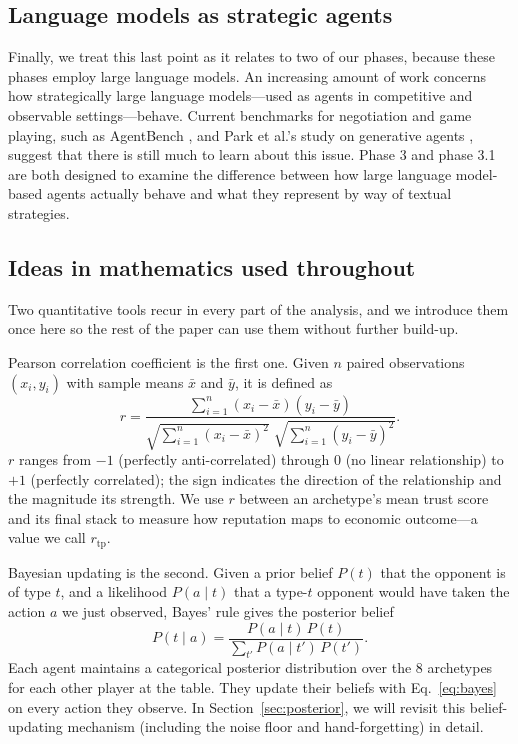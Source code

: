 \documentclass[10pt]{article} %
\newcommand{\rtp}{\ensuremath{r_{\mathrm{tp}}}}
\begin{document}
\subsection{Language models as strategic agents}
Finally, we treat this last point as it relates to two of our phases,
because these phases employ large language models. An increasing
amount of work concerns how strategically large language
models---used as agents in competitive and observable
settings---behave. Current benchmarks for negotiation and game
playing, such as AgentBench \citep{liu2024agentbench}, and Park et
al.'s study on generative agents \citep{park2023generative}, suggest
that there is still much to learn about this issue. Phase 3 and
phase 3.1 are both designed to examine the difference between how
large language model-based agents actually behave and what they
represent by way of textual strategies.

\subsection{Ideas in mathematics used throughout}
Two quantitative tools recur in every part of the analysis, and we
introduce them once here so the rest of the paper can use them
without further build-up.

Pearson correlation coefficient is the first one. Given $n$ paired
observations $(x_i, y_i)$ with sample means $\bar{x}$ and
$\bar{y}$, it is defined as
\begin{equation}
  r = \frac{\sum_{i=1}^{n}(x_i-\bar{x})(y_i-\bar{y})}
           {\sqrt{\sum_{i=1}^{n}(x_i-\bar{x})^2}\;
            \sqrt{\sum_{i=1}^{n}(y_i-\bar{y})^2}}.
  \label{eq:pearson}
\end{equation}
$r$ ranges from $-1$ (perfectly anti-correlated) through $0$ (no
linear relationship) to $+1$ (perfectly correlated); the sign
indicates the direction of the relationship and the magnitude its
strength. We use $r$ between an archetype's mean trust score and
its final stack to measure how reputation maps to economic
outcome---a value we call \rtp.

Bayesian updating is the second. Given a prior belief $P(t)$ that
the opponent is of type $t$, and a likelihood $P(a\mid t)$ that a
type-$t$ opponent would have taken the action $a$ we just
observed, Bayes' rule gives the posterior belief
\begin{equation}
  P(t\mid a) = \frac{P(a\mid t)\,P(t)}
                    {\sum_{t'} P(a\mid t')\,P(t')}.
  \label{eq:bayes}
\end{equation}
Each agent maintains a categorical posterior distribution over the
8 archetypes for each other player at the table. They update their
beliefs with Eq.~\ref{eq:bayes} on every action they observe. In
Section~\ref{sec:posterior}, we will revisit this belief-updating
mechanism (including the noise floor and hand-forgetting) in detail.
\end{document}
